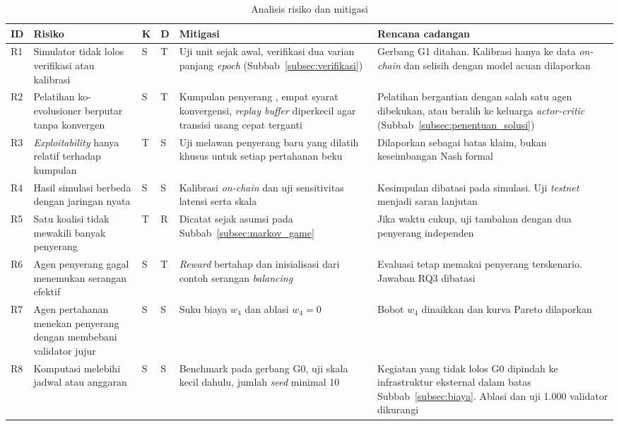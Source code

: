 \begin{table}[htbp]
\centering
\caption{Analisis risiko dan mitigasi}
\label{tab:risiko}
\footnotesize
\begin{tabular}{|p{0.6cm}|p{2.7cm}|p{0.6cm}|p{0.6cm}|p{3.6cm}|p{3.2cm}|}
\hline
\textbf{ID} & \textbf{Risiko} & \textbf{K} & \textbf{D} & \textbf{Mitigasi} & \textbf{Rencana cadangan} \\
\hline
R1 & Simulator tidak lolos verifikasi atau kalibrasi & S & T & Uji unit sejak awal, verifikasi dua varian panjang \textit{epoch} (Subbab~\ref{subsec:verifikasi}) & Gerbang G1 ditahan. Kalibrasi hanya ke data \textit{on-chain} dan selisih dengan model acuan dilaporkan \\
\hline
R2 & Pelatihan ko-evolusioner berputar tanpa konvergen & S & T & Kumpulan penyerang \parencite{wushishi2026coadam}, empat syarat konvergensi, \textit{replay buffer} diperkecil agar transisi usang cepat terganti & Pelatihan bergantian dengan salah satu agen dibekukan, atau beralih ke keluarga \textit{actor-critic} (Subbab~\ref{subsec:penentuan_solusi}) \\
\hline
R3 & \textit{Exploitability} hanya relatif terhadap kumpulan & T & S & Uji melawan penyerang baru yang dilatih khusus untuk setiap pertahanan beku & Dilaporkan sebagai batas klaim, bukan keseimbangan Nash formal \parencite{wushishi2026coadam} \\
\hline
R4 & Hasil simulasi berbeda dengan jaringan nyata & S & S & Kalibrasi \textit{on-chain} dan uji sensitivitas latensi serta skala & Kesimpulan dibatasi pada simulasi. Uji \textit{testnet} menjadi saran lanjutan \\
\hline
R5 & Satu koalisi tidak mewakili banyak penyerang & T & R & Dicatat sejak asumsi pada Subbab~\ref{subsec:markov_game} & Jika waktu cukup, uji tambahan dengan dua penyerang independen \\
\hline
R6 & Agen penyerang gagal menemukan serangan efektif & S & T & \textit{Reward} bertahap dan inisialisasi dari contoh serangan \textit{balancing} \parencite{laneve2025stochastic} & Evaluasi tetap memakai penyerang terskenario. Jawaban RQ3 dibatasi \\
\hline
R7 & Agen pertahanan menekan penyerang dengan membebani validator jujur & S & S & Suku biaya $w_4$ dan ablasi $w_4 = 0$ & Bobot $w_4$ dinaikkan dan kurva Pareto dilaporkan \\
\hline
R8 & Komputasi melebihi jadwal atau anggaran & S & S & Benchmark pada gerbang G0, uji skala kecil dahulu, jumlah \textit{seed} minimal 10 \parencite{wushishi2026coadam} & Kegiatan yang tidak lolos G0 dipindah ke infrastruktur eksternal dalam batas Subbab~\ref{subsec:biaya}. Ablasi dan uji 1.000 validator dikurangi \\

\end{tabular}
\end{table}
